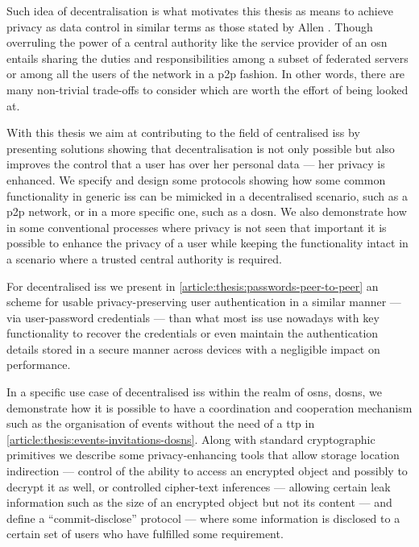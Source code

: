 Such idea of decentralisation is what motivates this thesis as means to achieve 
privacy as data control in similar terms as those stated by Allen \cite{Allen99}. 
Though overruling the power of a central authority like the service provider of 
an \ac{osn} entails sharing the duties and responsibilities among a subset of federated 
servers or among all the users of the network in a \ac{p2p} fashion. In other words, 
there are many non-trivial trade-offs to consider which are worth the effort of 
being looked at.

With this thesis we aim at contributing to the field of centralised \acp{is} by 
presenting solutions showing that decentralisation is not only possible but also 
improves the control that a user has over her personal data --- her privacy is enhanced. 
We specify and design some protocols showing how some common functionality in 
generic \acp{is} can be mimicked in a decentralised scenario, such as a \ac{p2p} 
network, or in a more specific one, such as a \ac{dosn}. We also demonstrate how 
in some conventional processes where privacy is not seen that important it is possible 
to enhance the privacy of a user while keeping the functionality intact in a scenario 
where a trusted central authority is required.

For decentralised \acp{is} we present in \cref{article:thesis:passwords-peer-to-peer} an 
scheme for usable privacy-preserving user authentication in a similar manner --- 
via user-password credentials --- than what most \acp{is} use nowadays with key 
functionality to recover the credentials or even maintain the authentication details 
stored in a secure manner across devices with a negligible impact on performance.

In a specific use case of decentralised \acp{is} within the realm of \acp{osn}, 
\acp{dosn}, we demonstrate how it is possible to have a coordination and cooperation 
mechanism such as the organisation of events without the need of a \ac{ttp} in \cref{article:thesis:events-invitations-dosns}. 
Along with standard cryptographic primitives we describe some privacy-enhancing 
tools that allow storage location indirection --- control of the ability to access 
an encrypted object and possibly to decrypt it as well, or controlled cipher-text 
inferences --- allowing certain leak information such as the size of an encrypted 
object but not its content --- and define a ``commit-disclose'' protocol --- where 
some information is disclosed to a certain set of users who have fulfilled some 
requirement.

